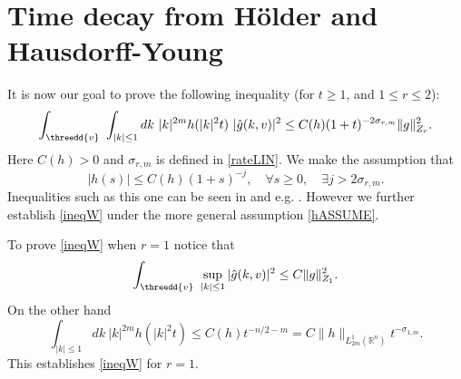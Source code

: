 \documentclass{amsart}
\numberwithin{equation}{section}
\begin{document}
\appendix
\section{Time decay from H{\"{o}}lder and Hausdorff-Young}
\label{secAPP:HHY}

It is now our goal to prove the following inequality (for $t \ge 1$, and $1\leq r \leq 2$):
\begin{equation}
\int_\threedd{v}~
 \int_{|k|\leq 1} dk ~ 
 |k|^{2m} h(|k|^2t) ~ |\hat{g}(k,{v})|^2
 \leq  C(h) (1+t)^{-2\sigma_{r,m}}
\|g\|_{Z_r}^2.
\label{ineqW}
\end{equation}
Here $C(h)>0$ and $\sigma_{r,m}$  is defined in \eqref{rateLIN}.
We make the assumption that
\begin{equation}
\left| h(s) \right| 
\le
C(h)
(1+s)^{-j},
\quad
\forall s \ge 0,
\quad
\exists
j > 2\sigma_{r,m}.
\label{hASSUME}
\end{equation}
Inequalities such as this one can be seen in \cite{MR1057534} and e.g. \cite{MR1379589,arXiv:0912.1742}.  However we further establish \eqref{ineqW} under the more general assumption \eqref{hASSUME}.

To prove \eqref{ineqW} when $r=1$ notice that 
$$
\int_\threedd{v}~
\sup_{|k|\leq 1} |\hat{g}(k,{v})|^2
 \leq  C
\|g\|_{Z_1}^2.
$$
On the other hand 
$$
 \int_{|k|\leq 1} dk ~ 
 |k|^{2m}
 h(|k|^2t)
\le  C(h) t^{-n/2-m}
= C\|h \|_{L^1_{2m}({{\mathbb R}^{n}})}  t^{-\sigma_{1,m}}.
$$
This establishes \eqref{ineqW} for $r=1$.
\end{document}
